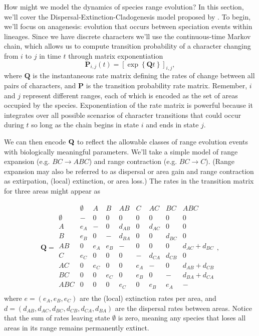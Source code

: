 How might we model the dynamics of species range evolution?
In this section, we'll cover the Dispersal-Extinction-Cladogenesis model proposed by \citet{Ree2005}.
To begin, we'll focus on anagenesis: evolution that occurs between speciation events within lineages.
Since we have discrete characters we'll use the continuous-time Markov chain, which allows us to compute transition probability of a character changing from $i$ to $j$ in time $t$ through matrix exponentiation
\[
\mathbf{P}_{i,j}(t) = \left[ \exp \left\lbrace \mathbf{Q}t \right\rbrace \right]_{i,j},
\]
where $\textbf{Q}$ is the instantaneous rate matrix defining the rates of change between all pairs of characters, and $\textbf{P}$ is the transition probability rate matrix.
Remember, $i$ and $j$ represent different ranges, each of which is encoded as the set of areas occupied by the species.
Exponentiation of the rate matrix is powerful because it integrates over all possible scenarios of character transitions that could occur during $t$ so long as the chain begins in state $i$ and ends in state $j$.

We can then encode ${\bf Q}$ to reflect the allowable classes of range evolution events with biologically meaningful parameters.
We'll take a simple model of range expansion (e.g. $BC \rightarrow ABC$) and range contraction (e.g. $BC \rightarrow C$).
(Range expansion may also be referred to as dispersal or area gain and range contraction as extirpation, (local) extinction, or area loss.)
The rates in the transition matrix for three areas might appear as

\[
\textbf{Q} = 
	\begin{array}{c|cccccccc}
		& \emptyset & A & B & AB & C & AC & BC & ABC \\
		\hline
		\emptyset 	& - 	& 0 	& 0 	& 0 		& 0			& 0 		& 0 		& 0 \\
		A 			& e_A 	& - 	& 0 	& d_{AB} 	& 0			& d_{AC} 	& 0 		& 0 \\
		B 			& e_B 	& 0 	& - 	& d_{BA}	& 0			& 0 		& d_{BC} 	& 0 \\
		AB 			& 0 	& e_A 	& e_B 	& - 		& 0			& 0 		& 0 		& d_{AC} + d_{BC} \\
		C 			& e_C 	& 0 	& 0 	& 0 		& - 		& d_{CA} 	& d_{CB} 	& 0 \\
		AC 			& 0 	& e_C 	& 0 	& 0 		& e_A		& - 		& 0 		& d_{AB} + d_{CB} \\
		BC 			& 0 	& 0 	& e_C 	& 0 		& e_B		& 0 		& - 		& d_{BA} + d_{CA} \\
		ABC 		& 0 	& 0 	& 0 	& e_C 		& 0 		& e_B 		& e_A 		& - \\								
	\end{array},
\]
where $e = ( e_A, e_B, e_C )$ are the (local) extinction rates per area, and $d = ( d_{AB}, d_{AC}, d_{BC}, d_{CB}, d_{CA}, d_{BA})$ are the dispersal rates between areas.
Notice that the sum of rates leaving state $\emptyset$ is zero, meaning any species that loses all areas in its range remains permanently extinct.


